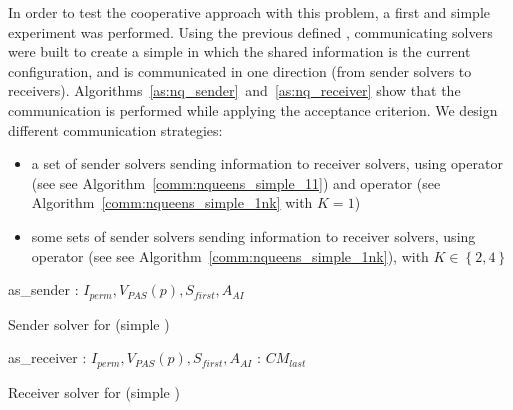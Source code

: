 \separation

In order to test the cooperative approach with this problem, a first and simple experiment was performed. Using the previous defined \as{}, communicating solvers were built to create a simple \commstr{} in which the shared information is the current configuration, and is communicated in one direction (from sender solvers to receivers). Algorithms~\ref{as:nq_sender}~and~\ref{as:nq_receiver} show that the communication is performed while applying the acceptance criterion. We design different communication strategies: 
\begin{itemize}
\item a set of sender solvers sending information to receiver solvers, using operator \oneTone{} (see see Algorithm~\ref{comm:nqueens_simple_11}) and operator \oneTn{} (see Algorithm~\ref{comm:nqueens_simple_1nk} with $K=1$)
\item some sets of sender solvers sending information to receiver solvers, using operator \oneTn{} (see see Algorithm~\ref{comm:nqueens_simple_1nk}), with $K\in\left\{2, 4\right\}$
\end{itemize}

\begin{algorithm}[h]
\dontprintsemicolon
\SetNoline
{}
   as\_sender\;
\algoindent {} : $I_{perm}, V_{PAS}(p), S_{first}, A_{AI}$ \;
\caption{Sender solver for \NQP{} (simple \commstr)}\label{as:nq_sender}
\end{algorithm}

\begin{algorithm}[h]
\dontprintsemicolon
\SetNoline
{}
   as\_receiver\;
\algoindent {} : $I_{perm}, V_{PAS}(p), S_{first}, A_{AI}$ \;
\algoindent {}: $CM_{last}$\;
\caption{Receiver solver for \NQP{} (simple \commstr)}\label{as:nq_receiver}
\end{algorithm}

